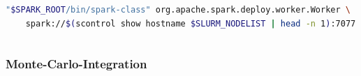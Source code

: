 \begin{frame}[fragile]
\begin{columns}
\begin{column}{0.5\linewidth}
\begin{lstlisting}[language=bash,numbers=none,xleftmargin=0pt,linewidth=1.05\linewidth,basicstyle=\scriptsize]
"$SPARK_ROOT/bin/spark-class" org.apache.spark.deploy.worker.Worker \
    spark://$(scontrol show hostname $SLURM_NODELIST | head -n 1):7077
\end{lstlisting}\vspace{-1.5\baselineskip}
    \end{column}\end{columns}
\end{frame}

\begin{frame}
    \frametitle{Monte-Carlo-Integration}
    \begin{columns}\begin{column}{0.35\linewidth}

\end{column}
\end{columns}
\end{frame}
